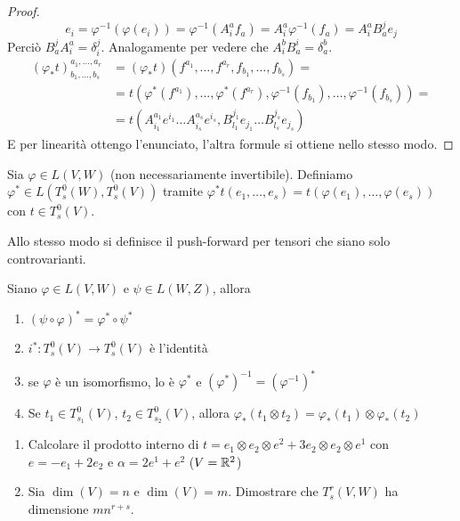 \begin{proof}
	\begin{equation*}
		e_i = \varphi^{-1}(\varphi(e_i)) = \varphi^{-1}(A_i^af_a) = A_i^a\varphi^{-1}(f_a) = A_i^a B_a^j e_j
	\end{equation*}
	Perciò $B_a^jA_i^a = \delta_i^j$. Analogamente per vedere che $A_i^bB_a^i = \delta_a^b$.
	\begin{align*}
		(\varphi_*t)_{b_1,\dots,b_s}^{a_1,\dots,a_r} &= (\varphi_*t)(f^{a_1},\dots, f^{a_r},f_{b_1},\dots,f_{b_s}) =\\
		&= t(\varphi^*(f^{a_1}),\dots, \varphi^*(f^{a_r}),\varphi^{-1}(f_{b_1}),\dots,\varphi^{-1}(f_{b_s})) =\\
		&=t (A_{i_1}^{a_1} e^{i_1}\dots A_{i_s}^{a_s} e^{i_s},B_{l_1}^{j_1}e_{j_1}\dots B_{l_s}^{j_s}e_{j_s})
	\end{align*}
	E per linearità ottengo l'enunciato, l'altra formule si ottiene nello stesso modo.


\end{proof}

\begin{definition}
	Sia $\varphi\in L(V,W)$ (non necessariamente invertibile). Definiamo $\varphi^*\in L(T_s^0(W),T_s^0(V))$ tramite $\varphi^*t(e_1,\dots,e_s) = t(\varphi(e_1),\dots,\varphi(e_s))$ con $t\in T_s^0(V)$.
	
	Allo stesso modo si definisce il push-forward per tensori che siano solo controvarianti.
\end{definition}

\begin{proposition}
	Siano $\varphi\in L(V,W)$ e $\psi\in L(W,Z)$, allora
	\begin{enumerate}
		\item $(\psi\circ\varphi)^*=\varphi^*\circ\psi^*$
		\item $i^*:T_s^0(V) \to T_s^0(V)$ è l'identità
		\item se $\varphi$ è un isomorfismo, lo è $\varphi^*$ e $(\varphi^*)^{-1} = (\varphi^{-1})^*$
		\item Se $t_1\in T_{s_1}^0(V)$, $t_2\in T_{s_2}^0(V)$, allora $\varphi_*(t_1\otimes t_2) = \varphi_*(t_1)\otimes \varphi_*(t_2)$
	\end{enumerate}
\end{proposition}

\begin{exercise}
	\begin{enumerate}
		\item Calcolare il prodotto interno di $t=e_1\otimes e_2\otimes e^2+3e_2\otimes e_2\otimes e^1$ con $e = -e_1+2e_2$ e $\alpha = 2e^1+e^2$ ($V=\mathbb R^2$)
		\item Sia $\dim(V) = n$ e $\dim(V) = m$. Dimostrare che $T_s^r(V,W)$ ha dimensione $mn^{r+s}$.
	\end{enumerate}
\end{exercise}

